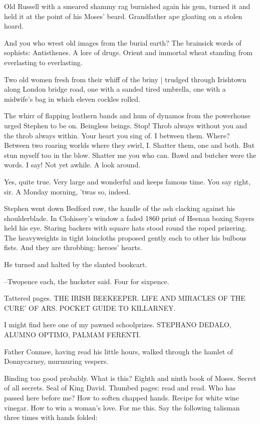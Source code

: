 Old Russell with a smeared shammy rag burnished again his gem,
turned it
and held it at the point of his Moses' beard.
Grandfather ape gloating on a stolen hoard.

And you who wrest old images from the burial earth?
The brainsick words of sophists:
Antisthenes.
A lore of drugs.
Orient and immortal wheat
standing from everlasting to everlasting.

Two old women
fresh from their whiff of the briny |
trudged through Irishtown along London bridge road,
one with a sanded tired umbrella,
one with a midwife's bag
in which eleven cockles rolled.

The whirr of flapping leathern bands
and hum of dynamos from the
powerhouse
urged Stephen to be on.
Beingless beings.
Stop!
Throb always
without you and the throb always within.
Your heart you sing of.
I
between them.
Where?
Between two roaring worlds where they swirl, I.
Shatter them, one and both.
But stun myself too in the blow.
Shatter me
you who can.
Bawd and butcher were the words.
I say!
Not yet awhile.
A
look around.

Yes, quite true.
Very large and wonderful and keeps famous time.
You say
right, sir.
A Monday morning, 'twas so, indeed.

Stephen went down Bedford row,
the handle of the ash
clacking against his
shoulderblade.
In Clohissey's window
a faded 1860 print of Heenan boxing
Sayers
held his eye.
Staring backers with square hats
stood round the
roped prizering.
The heavyweights in tight loincloths proposed gently
each to other
his bulbous fists.
And they are throbbing:
heroes' hearts.

He turned and halted by the slanted bookcart.

--Twopence each,
the huckster said.
Four for sixpence.

Tattered pages.
THE IRISH BEEKEEPER.
LIFE AND MIRACLES OF THE CURE' OF
ARS.
POCKET GUIDE TO KILLARNEY.

I might find here one of my pawned schoolprizes.
STEPHANO DEDALO, ALUMNO OPTIMO, PALMAM FERENTI.

Father Conmee, having read his little hours,
walked through the hamlet of
Donnycarney,
murmuring vespers.

Binding too good probably.
What is this?
Eighth and ninth book of Moses.
Secret of all secrets.
Seal of King David.
Thumbed pages: read and read.
Who has passed here before me?
How to soften chapped hands.
Recipe for
white wine vinegar.
How to win a woman's love.
For me this.
Say the
following talisman three times with hands folded:

